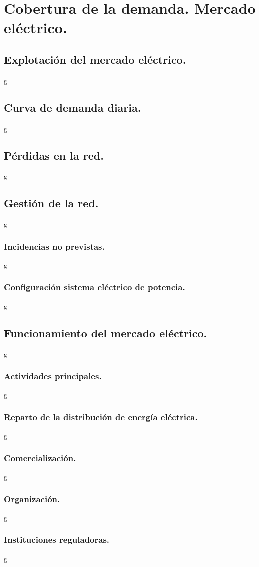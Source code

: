 \chapter{Cobertura de la demanda. Mercado eléctrico.}
\section{Explotación del mercado eléctrico.}
g
\section{Curva de demanda diaria.}
g
\section{Pérdidas en la red.}
g
\section{Gestión de la red.}
g
\subsection{Incidencias no previstas.}
g
\subsection{Configuración sistema eléctrico de potencia.}
g
\section{Funcionamiento del mercado eléctrico.}
g
\subsection{Actividades principales.}
g
\subsection{Reparto de la distribución de energía eléctrica.}
g
\subsection{Comercialización.}
g
\subsection{Organización.}
g
\subsection{Instituciones reguladoras.}
g

